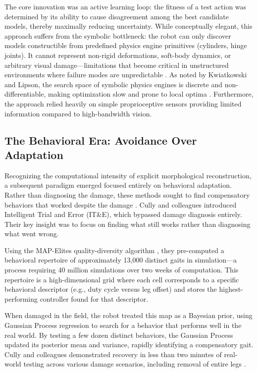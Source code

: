 \documentclass[12pt,a4paper,oneside]{report}
\begin{document}
The core innovation was an active learning loop: the fitness of a test action was determined by its ability to cause disagreement among the best candidate models, thereby maximally reducing uncertainty. While conceptually elegant, this approach suffers from the symbolic bottleneck: the robot can only discover models constructible from predefined physics engine primitives (cylinders, hinge joints). It cannot represent non-rigid deformations, soft-body dynamics, or arbitrary visual damage—limitations that become critical in unstructured environments where failure modes are unpredictable \cite{kwiatkowski2019task}. As noted by Kwiatkowski and Lipson, the search space of symbolic physics engines is discrete and non-differentiable, making optimization slow and prone to local optima \cite{kwiatkowski2019task}. Furthermore, the approach relied heavily on simple proprioceptive sensors providing limited information compared to high-bandwidth vision.

\subsection{The Behavioral Era: Avoidance Over Adaptation}

Recognizing the computational intensity of explicit morphological reconstruction, a subsequent paradigm emerged focused entirely on behavioral adaptation. Rather than diagnosing the damage, these methods sought to find compensatory behaviors that worked despite the damage \cite{cully2015robots}. Cully and colleagues introduced Intelligent Trial and Error (IT\&E), which bypassed damage diagnosis entirely. Their key insight was to focus on finding what still works rather than diagnosing what went wrong.

Using the MAP-Elites quality-diversity algorithm \cite{mouret2015illuminating}, they pre-computed a behavioral repertoire of approximately 13,000 distinct gaits in simulation—a process requiring 40 million simulations over two weeks of computation. This repertoire is a high-dimensional grid where each cell corresponds to a specific behavioral descriptor (e.g., duty cycle versus leg offset) and stores the highest-performing controller found for that descriptor.

When damaged in the field, the robot treated this map as a Bayesian prior, using Gaussian Process regression to search for a behavior that performs well in the real world. By testing a few dozen distinct behaviors, the Gaussian Process updated its posterior mean and variance, rapidly identifying a compensatory gait. Cully and colleagues demonstrated recovery in less than two minutes of real-world testing across various damage scenarios, including removal of entire legs \cite{cully2015robots}.
\end{document}

